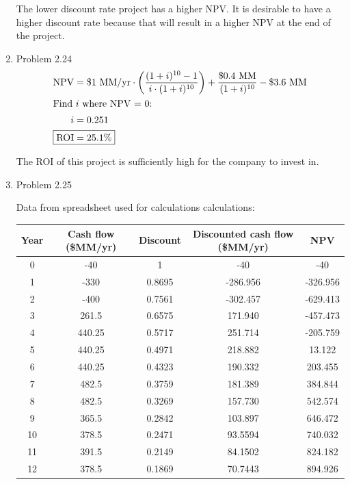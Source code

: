 \documentclass[12pt]{article}
\begin{document}
\begin{enumerate}
    The lower discount rate project has a higher NPV. It is desirable to have a higher discount rate because that will result in a higher NPV at the end of the project.


\newpage
    \item Problem 2.24
    \begin{align*}
        \mathrm{NPV} &= \$1 \text{ MM/yr} \cdot \left( \frac{(1+i)^{10}-1}{i\cdot(1+i)^{10}} \right) + \frac{\$0.4 \text{ MM}}{(1+i)^{10}} - \$3.6 \text{ MM} \\ 
        \intertext{Find $i$ where NPV = 0:}
        i &= 0.251 \\
        \Aboxed{\mathrm{ROI} &= 25.1\%} 
    \end{align*}

    The ROI of this project is sufficiently high for the company to invest in.


\newpage
    \item Problem 2.25

    Data from spreadsheet used for calculations calculations:
    
    \begin{tabular}{|c|c|c|c|c|}
        \hline
        Year & Cash flow (\$MM/yr) & Discount & Discounted cash flow (\$MM/yr) & NPV \\
        \hline
        0&	-40&	1&	-40&	-40 \\
        1&	-330&	0.8695&	-286.956&	-326.956 \\
        2&	-400&	0.7561&	-302.457&	-629.413 \\
        3&	261.5&	0.6575&	171.940&	-457.473 \\
        4&	440.25&	0.5717&	251.714&	-205.759 \\
        5&	440.25&	0.4971&	218.882&	13.122 \\
        6&	440.25&	0.4323&	190.332&	203.455 \\
        7&	482.5&	0.3759&	181.389&	384.844 \\
        8&	482.5&	0.3269&	157.730&	542.574 \\
        9&	365.5&	0.2842&	103.897&	646.472 \\
        10&	378.5&	0.2471&	93.5594&	740.032 \\
        11&	391.5&	0.2149&	84.1502&	824.182 \\
        12&	378.5&	0.1869&	70.7443&	894.926 \\
        \hline
    \end{tabular}


\end{enumerate}
\end{document}
